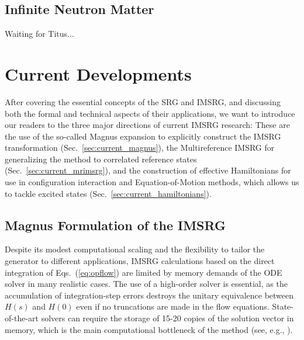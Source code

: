 {%
\subsection{\label{sec:imsrg_neutron_matter}Infinite Neutron Matter}
Waiting for Titus...

\section{\label{sec:current}Current Developments}
After covering the essential concepts of the SRG and IMSRG, and discussing
both the formal and technical aspects of their applications, we want to
introduce our readers to the three major directions of current IMSRG
research: These are the use of the so-called Magnus expansion to explicitly 
construct the IMSRG transformation (Sec.~\ref{sec:current_magnus}), the
Multireference IMSRG for generalizing the method to correlated 
reference states (Sec.~\ref{sec:current_mrimsrg}), and the construction
of effective Hamiltonians for use in configuration interaction and 
Equation-of-Motion methods, which allows us to tackle excited states 
(Sec.~\ref{sec:current_hamiltonians}).

\subsection{\label{sec:current_magnus}Magnus Formulation of the IMSRG}

Despite its modest computational scaling and the flexibility to tailor 
the generator to different applications, IMSRG calculations based on 
the direct integration of Eqs.~(\ref{eq:opflow}) are limited by memory 
demands of the ODE solver in many realistic cases. The use of a
high-order solver is essential, as the accumulation of integration-step
errors destroys the unitary equivalence between $H(s)$ and $H(0)$ even
if no truncations are made in the flow equations. State-of-the-art
solvers can require the storage of 15-20 copies of the solution vector
in memory, which is the main computational bottleneck of the method
(see, e.g., \cite{Hindmarsh:1983pd,Brown:1989qd,Hindmarsh:2005kl}).

}
